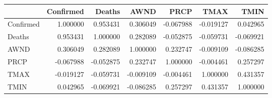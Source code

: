 \begin{tabular}{lrrrrrr}
\toprule
{} &  Confirmed &    Deaths &      AWND &      PRCP &      TMAX &      TMIN \\
\midrule
Confirmed &   1.000000 &  0.953431 &  0.306049 & -0.067988 & -0.019127 &  0.042965 \\
Deaths    &   0.953431 &  1.000000 &  0.282089 & -0.052875 & -0.059731 & -0.069921 \\
AWND      &   0.306049 &  0.282089 &  1.000000 &  0.232747 & -0.009109 & -0.086285 \\
PRCP      &  -0.067988 & -0.052875 &  0.232747 &  1.000000 & -0.004461 &  0.257297 \\
TMAX      &  -0.019127 & -0.059731 & -0.009109 & -0.004461 &  1.000000 &  0.431357 \\
TMIN      &   0.042965 & -0.069921 & -0.086285 &  0.257297 &  0.431357 &  1.000000 \\
\bottomrule
\end{tabular}
